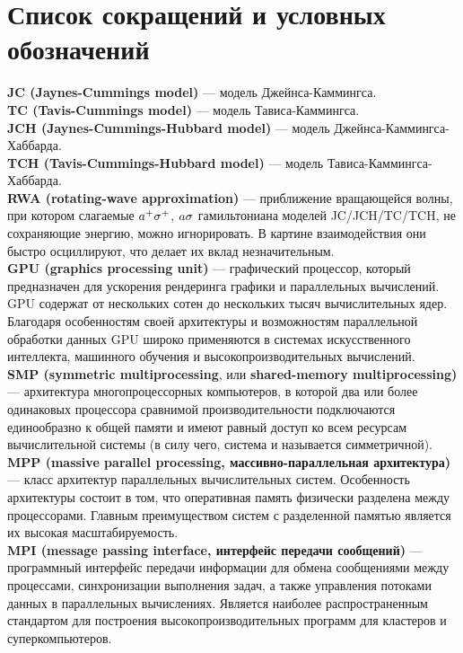 \chapter*{Список сокращений и условных обозначений} %

\noindent\textbf{JC (Jaynes-Cummings model)} --- модель Джейнса-Каммингса.\\
\noindent\textbf{TC (Tavis-Cummings model)} --- модель Тависа-Каммингса.\\
\noindent\textbf{JCH (Jaynes-Cummings-Hubbard model)} --- модель Джейнса-Каммингса-Хаббарда.\\
\noindent\textbf{TCH (Tavis-Cummings-Hubbard model)} --- модель Тависа-Каммингса-Хаббарда.\\
\noindent\textbf{RWA (rotating-wave approximation)} --- приближение вращающейся волны, при котором слагаемые
$a^{+}\sigma^{+}$, $a\sigma$ гамильтониана моделей JC/JCH/TC/TCH, не сохраняющие энергию, можно игнорировать. В картине взаимодействия они быстро осциллируют, что делает их вклад незначительным.\\
\noindent\textbf{GPU (graphics processing unit)} --- графический процессор, который предназначен для ускорения рендеринга графики и параллельных вычислений. GPU содержат от нескольких сотен до нескольких тысяч вычислительных ядер. Благодаря особенностям своей архитектуры и возможностям параллельной обработки данных GPU широко применяются в системах искусственного интеллекта, машинного обучения и высокопроизводительных вычислений.\\
\noindent\textbf{SMP (symmetric multiprocessing}, или \textbf{shared-memory multiprocessing)} --- архитектура многопроцессорных компьютеров, в которой два или более одинаковых процессора сравнимой производительности подключаются единообразно к общей памяти и имеют равный доступ ко всем ресурсам вычислительной системы (в силу чего, система и называется симметричной).\\
\noindent\textbf{MPP (massive parallel processing, массивно-параллельная архитектура)} --- класс архитектур параллельных вычислительных систем. Особенность архитектуры состоит в том, что оперативная память физически разделена между процессорами. Главным преимуществом систем с разделенной памятью является их высокая масштабируемость.\\
\noindent\textbf{MPI (message passing interface, интерфейс передачи сообщений)} --- программный интерфейс передачи информации для обмена сообщениями между процессами, синхронизации выполнения задач, а также управления потоками данных в параллельных вычислениях. Является наиболее распространенным стандартом для построения высокопроизводительных программ для кластеров и суперкомпьютеров.
